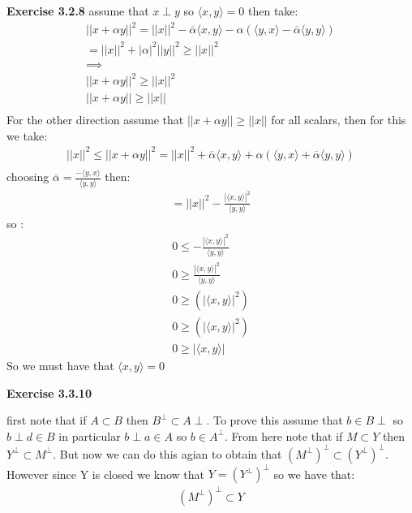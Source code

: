\documentclass[12pt]{article}
\newcommand{\mpp}{(M^\perp)^\perp}
\newenvironment{exercise}[1]{\vspace{.1in}\noindent\textbf{Exercise #1 \hspace{.05em}}}{}
\theoremstyle{definition}
\theoremstyle{remark}
\begin{document}
\begin{exercise}{3.2.8}
	assume that $x\perp y$ so $\langle x, y\rangle =0$ then take:
	\begin{align}
		||x+\alpha y||^2=||x||^2- \overline{\alpha} \langle x, y\rangle -\alpha (\langle y, x\rangle - \overline{\alpha}\langle y, y\rangle ) \\
		=||x||^2+|\alpha|^2 ||y||^2\geq ||x||^2                                                                                               \\
		\implies                                                                                                                              \\
		||x+\alpha y||^2\geq ||x||^2                                                                                                          \\
		||x+\alpha y||\geq ||x||                                                                                                              \\
	\end{align}
	For the other direction assume that $||x+\alpha y||\geq ||x||$  for all scalars, then for this we take:
	\begin{align}
		||x||^2\leq ||x+\alpha y||^2=||x||^2+ \overline{\alpha} \langle x, y\rangle +\alpha (\langle y, x\rangle + \overline{\alpha}\langle y, y\rangle ) \\
	\end{align}
	choosing $\overline{\alpha}=\frac{-\langle y, x\rangle }{\langle y, y\rangle }$ then:
	\begin{align}
		= ||x||^2-\frac{|\langle x, y\rangle |^2}{\langle y, y\rangle }
	\end{align}
	so :
	\begin{align}
		0\leq -\frac{|\langle x, y\rangle |^2}{\langle y, y\rangle } \\
		0\geq \frac{|\langle x, y\rangle |^2}{\langle y, y\rangle }  \\
		0\geq (|\langle x, y\rangle |^2)                             \\
		0\geq (|\langle x, y\rangle |^2)                             \\
		0\geq |\langle x, y\rangle |
	\end{align}
	So we must have that $\langle x,y\rangle = 0$
\end{exercise}

\begin{exercise}{3.3.10}

	first note that if $A\subset B$ then $B^\perp\subset A\perp$. To prove this assume that $b\in B\perp$ so $b\perp d\in B$ in particular $b\perp a\in A$ so $b\in A^{\perp}$. From here note that if $M\subset Y$ then $Y^\perp \subset M^\perp$. But now we can do this agian to obtain that $(M^{\perp})^\perp\subset (Y^{\perp})^\perp$. However since Y is closed we know that $Y=(Y^\perp)^\perp$ so we have that:
	\begin{align}
		\mpp\subset Y
	\end{align}

\end{exercise}
\end{document}
